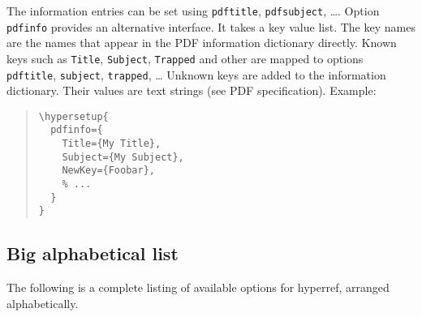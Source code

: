 \documentclass{article}
\newcommand*{\xpackage}[1]{\textsf{#1}}
\begin{document}
The information entries can be set using \texttt{pdftitle},
\texttt{pdfsubject}, \dots. Option \texttt{pdfinfo} provides an alternative
interface. It takes a key value list. The key names are the names that
appear in the PDF information dictionary directly. Known keys such as
\texttt{Title}, \texttt{Subject}, \texttt{Trapped} and other are mapped to
options \texttt{pdftitle}, \texttt{subject}, \texttt{trapped}, \dots
Unknown keys are added to the information dictionary. Their values are text
strings (see PDF specification).
Example:
\begin{quote}
\begin{verbatim}
\hypersetup{
  pdfinfo={
    Title={My Title},
    Subject={My Subject},
    NewKey={Foobar},
    % ...
  }
}
\end{verbatim}
\end{quote}

\subsection{Big alphabetical list}

The following is a complete listing of available options for
\xpackage{hyperref}, arranged alphabetically.
\end{document}
